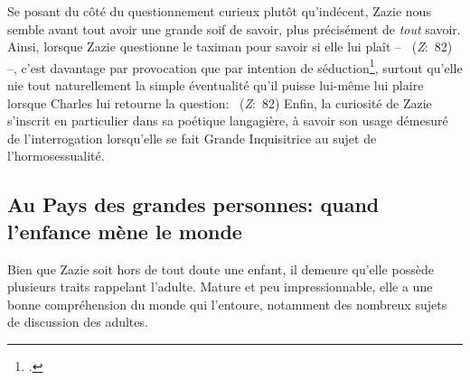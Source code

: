 Se posant du côté du questionnement curieux plutôt qu'indécent, Zazie nous semble avant tout avoir une grande soif de savoir, plus précisément de \textit{tout} savoir.
Ainsi, lorsque Zazie questionne le taximan pour savoir si elle lui plaît -- ~(\textit{Z}:~82) --, c'est davantage par provocation que par intention de séduction\footcite[90]{Maurin2007}, surtout qu'elle nie tout naturellement la simple éventualité qu'il puisse lui-même lui plaire lorsque Charles lui retourne la question: ~(\textit{Z}:~82)
Enfin, la curiosité de Zazie s'inscrit en particulier dans sa poétique langagière, à savoir son usage démesuré de l'interrogation lorsqu'elle se fait Grande Inquisitrice au sujet de l'hormosessualité.


\subsection{Au Pays des grandes personnes: quand l'enfance mène le monde}
Bien que Zazie soit hors de tout doute une enfant, il demeure qu'elle possède plusieurs traits rappelant l'adulte. Mature et peu impressionnable, elle a une bonne compréhension du monde qui l'entoure, notamment des nombreux sujets de discussion des adultes.

